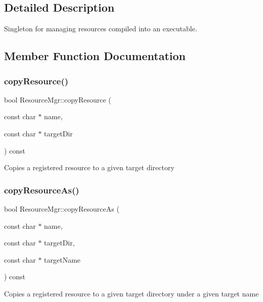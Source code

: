 \subsection{Detailed Description}
Singleton for managing resources compiled into an executable. 

\subsection{Member Function Documentation}
\mbox{\label{class_resource_mgr_add302925074918ff666629dcdd755f97}} 
\subsubsection{\texorpdfstring{copyResource()}{copyResource()}}
{\footnotesize\ttfamily bool Resource\+Mgr\+::copy\+Resource (\begin{DoxyParamCaption}\item[{const char $\ast$}]{name,  }\item[{const char $\ast$}]{target\+Dir }\end{DoxyParamCaption}) const}

Copies a registered resource to a given target directory \mbox{\label{class_resource_mgr_ac6de7e012b820c139b1dc537987cab2c}} 
\subsubsection{\texorpdfstring{copyResourceAs()}{copyResourceAs()}}
{\footnotesize\ttfamily bool Resource\+Mgr\+::copy\+Resource\+As (\begin{DoxyParamCaption}\item[{const char $\ast$}]{name,  }\item[{const char $\ast$}]{target\+Dir,  }\item[{const char $\ast$}]{target\+Name }\end{DoxyParamCaption}) const}

Copies a registered resource to a given target directory under a given target name \mbox{\label{class_resource_mgr_a0feee9b73a63ad9b9e140624b42ccaee}} 
